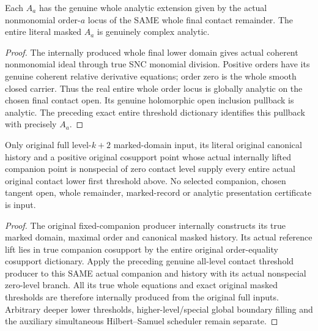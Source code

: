 \begin{corollary}
\label{hir:original-all-level-contact-literal-first-analytic-extension}
\leanok
{}
Each $A_a$ has the genuine whole analytic extension given by the actual
nonmonomial order-$a$ locus of the SAME whole final contact remainder. The
entire literal masked $A_a$ is genuinely complex analytic.
\end{corollary}
\begin{proof}
The internally produced whole final lower domain gives actual coherent
nonmonomial ideal through true SNC monomial division. Positive orders have
its genuine coherent relative derivative equations; order zero is the whole
smooth closed carrier. Thus the real entire whole order locus is globally
analytic on the chosen final contact open. Its genuine holomorphic open
inclusion pullback is analytic. The preceding exact entire threshold
dictionary identifies this pullback with precisely $A_a$.
\end{proof}

\begin{theorem}
\label{hir:original-full-positive-contact-literal-first-analytic-consumer}
\leanok
{}
Only original full level-$k+2$ marked-domain input, its literal original
canonical history and a positive original cosupport point whose actual
internally lifted companion point is nonspecial of zero contact level
supply every entire actual original contact lower first threshold above.
No selected companion, chosen tangent open, whole remainder, marked-record
or analytic presentation certificate is input.
\end{theorem}
\begin{proof}
The original fixed-companion producer internally constructs its true marked
domain, maximal order and canonical masked history. Its actual reference lift
lies in true companion cosupport by the entire original order-equality
cosupport dictionary. Apply the preceding genuine all-level contact threshold
producer to this SAME actual companion and history with its actual nonspecial
zero-level branch. All its true whole equations and exact original masked
thresholds are therefore internally produced from the original full inputs.
Arbitrary deeper lower thresholds, higher-level/special global boundary filling
and the auxiliary simultaneous Hilbert--Samuel scheduler remain separate.
\end{proof}
